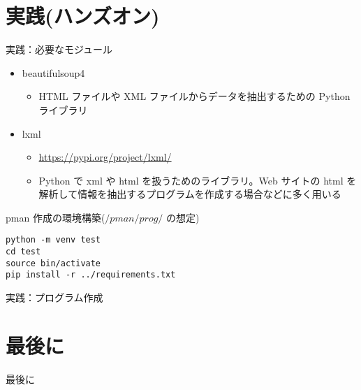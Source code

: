 \documentclass[compress,dvipdfmx,11pt]{beamer}
\begin{document}
\section{実践(ハンズオン)}
\label{sec:orgf9fa3e2}
\begin{frame}[label={sec:org7be16f3},fragile]{実践：必要なモジュール}
 \begin{itemize}
\item beautifulsoup4
\begin{itemize}
\item HTML ファイルや XML ファイルからデータを抽出するための Python ライブラリ
\end{itemize}
\item lxml
\begin{itemize}
\item \url{https://pypi.org/project/lxml/}
\item Python で xml や html を扱うためのライブラリ。Web サイトの html を
解析して情報を抽出するプログラムを作成する場合などに多く用いる
\end{itemize}
\end{itemize}

pman 作成の環境構築(\(/pman/prog/\) の想定)
\begin{verbatim}
python -m venv test
cd test
source bin/activate
pip install -r ../requirements.txt
\end{verbatim}
\end{frame}

\begin{frame}[label={sec:org5f9981d}]{実践：プログラム作成}
\end{frame}

\section{最後に}
\label{sec:org4ea0c13}
\begin{frame}[label={sec:orge41d0f7}]{最後に}
\end{frame}
\end{document}
